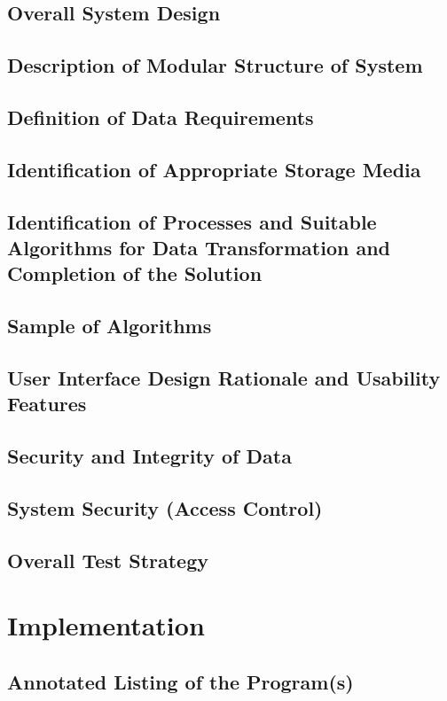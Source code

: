 \documentclass[11pt]{article}
\begin{document}
        \subsection{Overall System Design}
        \subsection{Description of Modular Structure of System}
        \subsection{Definition of Data Requirements}
        \subsection{Identification of Appropriate Storage Media}
        \subsection{Identification of Processes and Suitable Algorithms for Data Transformation and Completion of the Solution}
        \subsection{Sample of Algorithms}
        \subsection{User Interface Design Rationale and Usability Features}
        \subsection{Security and Integrity of Data}
        \subsection{System Security (Access Control)}
        \subsection{Overall Test Strategy}

    \section{Implementation}
        \subsection{Annotated Listing of the Program(s)}
\end{document}
